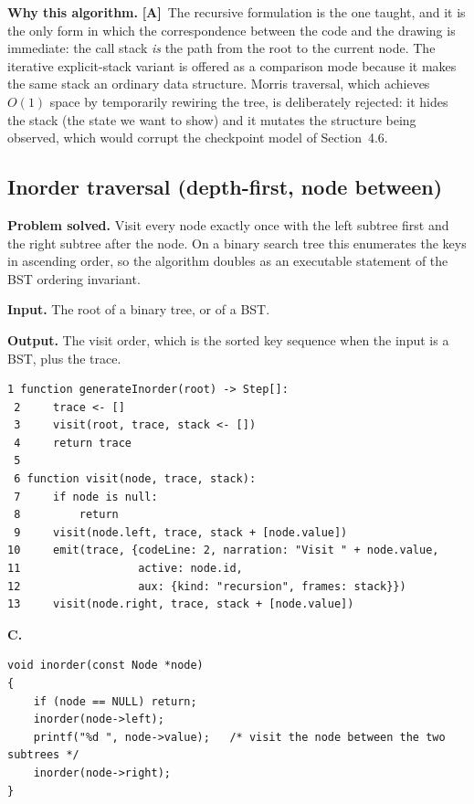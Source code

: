 \documentclass[11pt,a4paper]{article}
\newcommand{\A}{\textcolor{asmc}{\textbf{[A]}}}     %
\newcommand{\ct}[1]{\texttt{#1}}
\begin{document}
\smallskip
\noindent\textbf{Why this algorithm.} \A\ The recursive formulation is the one taught, and it is
the only form in which the correspondence between the code and the drawing is immediate: the
call stack \emph{is} the path from the root to the current node. The iterative explicit-stack
variant is offered as a comparison mode because it makes the same stack an ordinary data
structure. Morris traversal, which achieves $O(1)$ space by temporarily rewiring the tree, is
deliberately rejected: it hides the stack (the state we want to show) and it mutates the structure
being observed, which would corrupt the checkpoint model of Section~4.6.

\subsection{Inorder traversal (depth-first, node between)}

\noindent\textbf{Problem solved.} Visit every node exactly once with the left subtree first and
the right subtree after the node. On a binary search tree this enumerates the keys in ascending
order, so the algorithm doubles as an executable statement of the BST ordering invariant.

\smallskip
\noindent\textbf{Input.} The root of a binary tree, or of a BST.

\smallskip
\noindent\textbf{Output.} The visit order, which is the sorted key sequence when the input is a
BST, plus the trace.

\begin{lstlisting}[style=pseudo,caption={Instrumented inorder traversal. The single \ct{emit} sits
between the two recursive calls, which is exactly the difference between the three depth-first
orders.},label={lst:inorder}]
 1 function generateInorder(root) -> Step[]:
 2     trace <- []
 3     visit(root, trace, stack <- [])
 4     return trace
 5
 6 function visit(node, trace, stack):
 7     if node is null:
 8         return
 9     visit(node.left, trace, stack + [node.value])
10     emit(trace, {codeLine: 2, narration: "Visit " + node.value,
11                  active: node.id,
12                  aux: {kind: "recursion", frames: stack}})
13     visit(node.right, trace, stack + [node.value])
\end{lstlisting}

\smallskip
\noindent\textbf{C.}
\begin{lstlisting}[style=c,caption={Inorder traversal in C.},label={lst:c-inorder}]
void inorder(const Node *node)
{
    if (node == NULL) return;
    inorder(node->left);
    printf("%d ", node->value);   /* visit the node between the two subtrees */
    inorder(node->right);
}
\end{lstlisting}
\end{document}

